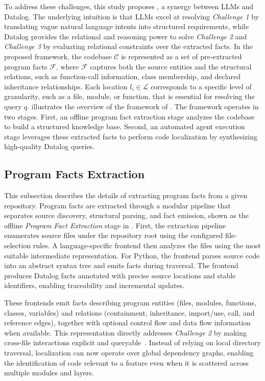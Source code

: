 To address these challenges, this study proposes \tooldataloc, a synergy between LLMs and Datalog. The underlying intuition is that LLMs excel at resolving \textit{Challenge 1} by translating vague natural language intents into structured requirements, while Datalog provides the relational and reasoning power to solve \textit{Challenge 2} and \textit{Challenge 3} by evaluating relational constraints over the extracted facts.
In the proposed framework, the codebase $\mathcal{C}$ is represented as a set of pre-extracted program facts $\mathcal{F}$, where $\mathcal{F}$ captures both the source entities and the structural relations, such as function-call information, class membership, and declared inheritance relationships. Each location $l_i \in \mathcal{L}$ corresponds to a specific level of granularity, such as a file, module, or function, that is essential for resolving the query $q$.  illustrates the overview of the framework of \tooldataloc. The framework operates in two stages. First, an offline program fact extraction stage analyzes the codebase to build a structured knowledge base. Second, an automated agent execution stage leverages these extracted facts to perform code localization by synthesizing high-quality Datalog queries.

\subsection{Program Facts Extraction}\label{sec:fact-extraction-dataloc}
This subsection describes the details of extracting program facts from a given repository.
Program facts are extracted through a modular pipeline that separates source discovery, structural parsing, and fact emission, shown as the offline \textit{Program Fact Extraction} stage in . First, the extraction pipeline enumerates source files under the repository root using the configured file-selection rules. A language-specific frontend then analyzes the files using the most suitable intermediate representation. For Python, the frontend parses source code into an abstract syntax tree and emits facts during traversal. The frontend produces Datalog facts annotated with precise source locations and stable identifiers, enabling traceability and incremental updates.

These frontends emit facts describing program entities (files, modules, functions, classes, variables) and relations (containment, inheritance, import/use, call, and reference edges), together with optional control flow and data flow information when available. This representation directly addresses \textit{Challenge 2} by making cross-file interactions explicit and queryable~\cite{wu2021diffbase}. Instead of relying on local directory traversal, localization can now operate over global dependency graphs, enabling the identification of code relevant to a feature even when it is scattered across multiple modules and layers.

